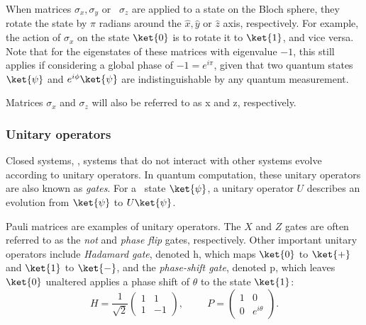When matrices $\sigma_x, \sigma_y$ or  $\sigma_z$ are applied to a state on the Bloch sphere, they rotate the state by $\pi$ radians around the $\hat{x}, \hat{y}$ or $\hat{z}$ axis, respectively. For example, the action of $\sigma_x$ on the state $\ket{0}$ is to rotate it to $\ket{1}$, and vice versa. Note that for the eigenstates of these matrices with eigenvalue $-1$, this still applies if considering a global phase of $-1 = e^{i\pi}$, given that two quantum states $\ket{\psi}$ and $e^{i\phi}\ket{\psi}$ are indistinguishable by any quantum measurement.

Matrices $\sigma_x$ and $\sigma_z$ will also be referred to as \gls{x} and \gls{z}, respectively.

\subsubsection{Unitary operators}
Closed systems, , systems that do not interact with other systems evolve according to unitary operators. In quantum computation, these unitary operators are also known as \emph{gates}. For a  state $\ket{\psi}$, a unitary operator $U$ describes an evolution from $\ket{\psi}$ to $ U\ket{\psi}$.

Pauli matrices are examples of unitary operators. The $X$ and $Z$ gates are often referred to as the \emph{not} and \emph{phase flip} gates, respectively. Other important unitary operators include   \emph{Hadamard gate}, denoted \gls{h}, which maps $\ket{0}$ to $\ket{+}$ and $\ket{1}$ to  $\ket{-}$, and the \emph{phase-shift gate}, denoted \gls{p}, which leaves $\ket{0}$ unaltered applies a phase shift of $\theta$ to the state $\ket{1}$:
\begin{equation*}
 H = \frac{1}{\sqrt{2}}\begin{pmatrix} 1 & 1\\ 1 & -1 \end{pmatrix}, \hspace{1cm} P = \begin{pmatrix} 1 & 0\\ 0 & e^{i \theta} \end{pmatrix}.
\end{equation*}
 

